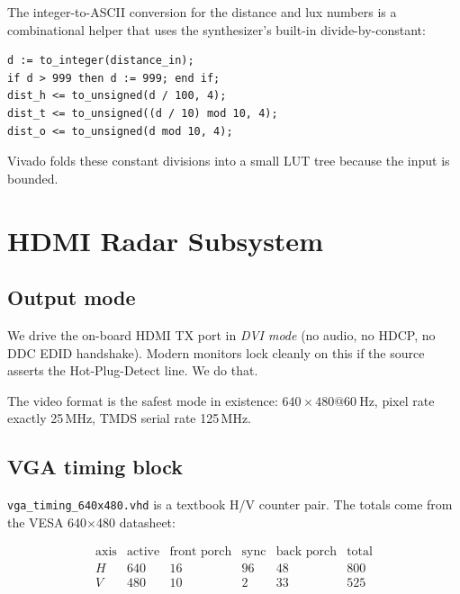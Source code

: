 \documentclass[11pt,a4paper]{article}
\begin{document}
The integer-to-ASCII conversion for the distance and lux numbers is a
combinational helper that uses the synthesizer's built-in
divide-by-constant:

\begin{lstlisting}[caption={Decimal conversion used by the OLED text engine.}]
d := to_integer(distance_in);
if d > 999 then d := 999; end if;
dist_h <= to_unsigned(d / 100, 4);
dist_t <= to_unsigned((d / 10) mod 10, 4);
dist_o <= to_unsigned(d mod 10, 4);
\end{lstlisting}

Vivado folds these constant divisions into a small LUT tree because the
input is bounded.

\section{HDMI Radar Subsystem}

\subsection{Output mode}

We drive the on-board HDMI TX port in \emph{DVI mode} (no audio, no
HDCP, no DDC EDID handshake).  Modern monitors lock cleanly on this if
the source asserts the Hot-Plug-Detect line.  We do that.

The video format is the safest mode in existence:
\(640 \times 480 @ 60~\text{Hz}\), pixel rate exactly 25\,MHz, TMDS
serial rate 125\,MHz.

\subsection{VGA timing block}

\texttt{vga\_timing\_640x480.vhd} is a textbook H/V counter pair.  The
totals come from the VESA 640$\times$480 datasheet:

\[
\begin{array}{l|l|l|l|l|l}
  \text{axis} & \text{active} & \text{front porch} & \text{sync} & \text{back porch} & \text{total} \\
  \hline
  H & 640 & 16 & 96 & 48 & 800 \\
  V & 480 & 10 &  2 & 33 & 525 \\
\end{array}
\]
\end{document}
